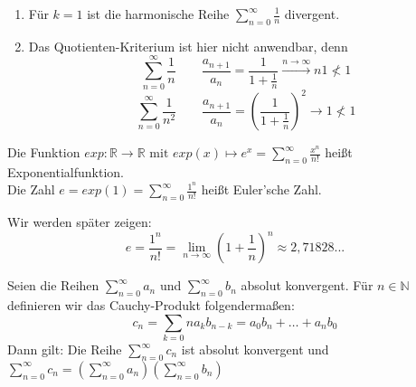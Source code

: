 \documentclass[a4paper,titlepage,oneside]{article}
\def\N{\ensuremath{\mathbb{N}} }
\def\R{\ensuremath{\mathbb{R}} }
\def\e{\ensuremath{\mathit{e}} }
\newcommand{\suminf}[2][n]{\ensuremath{\sum_{#1= 0}^{\infty}{#2}}}
\renewcommand{\liminf}[2][n]{\ensuremath{\lim\limits_{#1 \rightarrow \infty}{#2}}}
\newcommand{\longtoinf}[1][n]{\ensuremath{\overset{\scriptscriptstyle{#1 \to \infty}}{\longrightarrow}}}
\theoremstyle{thmstyle}
\begin{document}
\begin{subbem}
\begin{enumerate}
\item Für \(k = 1\) ist die harmonische Reihe \suminf{\frac{1}{n}} divergent.
\item Das Quotienten-Kriterium ist hier nicht anwendbar, denn \\
\[\suminf{\frac{1}{n}} \qquad \frac{a_{n+1}}{a_n} = \frac{1}{1 + \frac{1}{n}} \longtoinf{n} 1 \not < 1\]
\[\suminf{\frac{1}{n^2}} \qquad \frac{a_{n+1}}{a_n} = \left(\frac{1}{1 + \frac{1}{n}}\right)^2 \longrightarrow 1 \not < 1\]
\end{enumerate}
\end{subbem}

\begin{subdefi}
Die Funktion \(exp: \R \to \R \text{ mit } exp(x) \mapsto \e^x = \suminf{\frac{x^n}{n!}}\) heißt Exponentialfunktion.\\
Die Zahl \(\e = exp(1) = \suminf{\frac{1^n}{n!}} \) heißt Euler'sche Zahl.
\end{subdefi}

\begin{subbem}
Wir werden später zeigen:
\[\e = \frac{1^n}{n!} = \liminf{\left(1 + \frac{1}{n}\right)^n} \approx 2,71828...\]
\end{subbem}

\begin{subsatz}
Seien die Reihen \suminf{a_n} und \suminf{b_n} absolut konvergent. Für $n \in \N$ definieren wir das Cauchy-Produkt folgendermaßen:
\[c_n = \sum_{k = 0}{n}{a_kb_{n-k}} = a_0b_n + \dots + a_nb_0\]
Dann gilt: Die Reihe \suminf{c_n} ist absolut konvergent und $\suminf{c_n} = \left( \suminf{a_n} \right)  \left( \suminf{b_n} \right) $
\proof[Beweisidee]
\end{subsatz}
\end{document}
